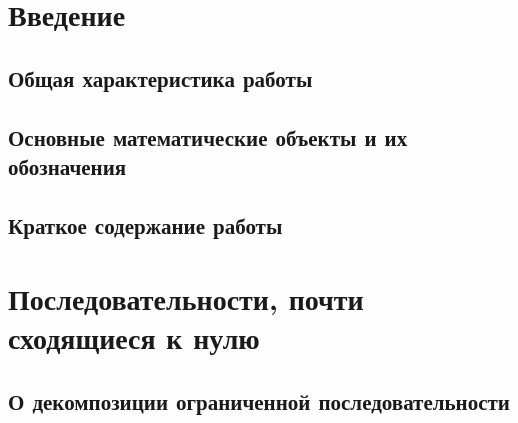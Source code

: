 \documentclass[12pt,a4paper,openbib]{report}
\theoremstyle{definition}
\begin{document}





\pagestyle{plain}



\setcounter{page}{2}
\tableofcontents

\chapter*{Введение}

\section*{Общая характеристика работы}


\section*{Основные математические объекты и их обозначения}


\section*{Краткое содержание работы}


\chapter{Последовательности, почти сходящиеся к нулю}

	

	\section{О декомпозиции ограниченной последовательности}
	
\end{document}
